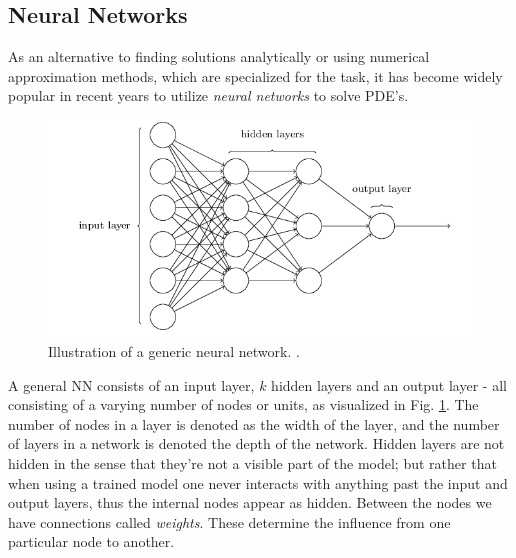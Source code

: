 \subsection{Neural Networks } 

As an alternative to finding solutions analytically or using numerical approximation methods, which are specialized for the task, it has become widely popular in recent years to utilize \textit{neural networks} to solve PDE's.


\begin{figure}[H]
    \centering
    \includegraphics[width=1\linewidth]{project_2/figures/generic_NN.png}
    \caption{Illustration of a generic neural network. \cite[Taken from][Ch.1]{nielsen}.}
    \label{fig:NN}
\end{figure}

A general NN consists of an input layer, $k$ hidden layers and an output layer - all consisting of a varying number of nodes or units, as visualized in Fig. \ref{fig:NN}. The number of nodes in a layer is denoted as the width of the layer, and the number of layers in a network is denoted the depth of the network. 
Hidden layers are not hidden in the sense that they're not a visible part of the model; but rather that when using a trained model one never interacts with anything past the input and output layers, thus the internal nodes appear as hidden. 
Between the nodes we have connections called \textit{weights}. These determine the influence from one particular node to another. 

